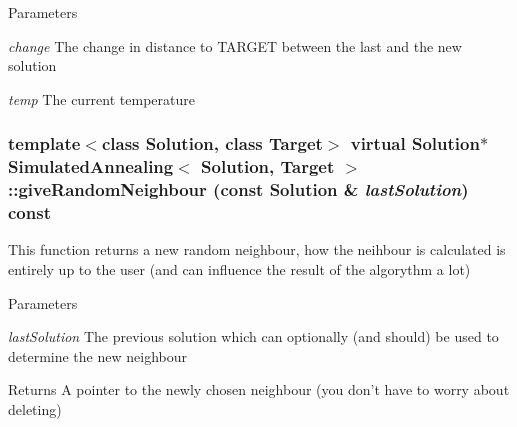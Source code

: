 \begin{DoxyParams}{Parameters}
\item[{\em change}]The change in distance to TARGET between the last and the new solution \item[{\em temp}]The current temperature \end{DoxyParams}
\hypertarget{class_simulated_annealing_a71b64ea8dca2d5bba7fb6d4b6cde1c81}{
\subsubsection[{giveRandomNeighbour}]{\setlength{\rightskip}{0pt plus 5cm}template$<$class Solution, class Target$>$ virtual Solution$\ast$ {\bf SimulatedAnnealing}$<$ Solution, Target $>$::giveRandomNeighbour (const Solution \& {\em lastSolution}) const}}
\label{class_simulated_annealing_a71b64ea8dca2d5bba7fb6d4b6cde1c81}
This function returns a new random neighbour, how the neihbour is calculated is entirely up to the user (and can influence the result of the algorythm a lot) 
\begin{DoxyParams}{Parameters}
\item[{\em lastSolution}]The previous solution which can optionally (and should) be used to determine the new neighbour \end{DoxyParams}
\begin{DoxyReturn}{Returns}
A pointer to the newly chosen neighbour (you don't have to worry about deleting) 
\end{DoxyReturn}


